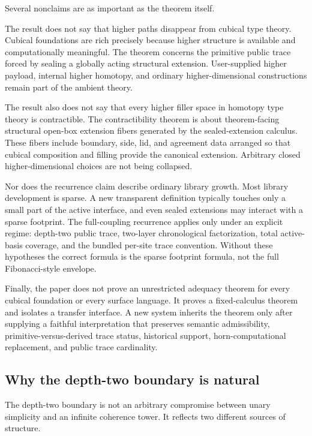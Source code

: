 \documentclass{lmcs}
\begin{document}
Several nonclaims are as important as the theorem itself.

The result does not say that higher paths disappear from cubical type theory.  Cubical
foundations are rich precisely because higher structure is available and computationally
meaningful.  The theorem concerns the primitive public trace forced by sealing a globally
acting structural extension.  User-supplied higher payload, internal higher homotopy, and
ordinary higher-dimensional constructions remain part of the ambient theory.

The result also does not say that every higher filler space in homotopy type theory is
contractible.  The contractibility theorem is about theorem-facing structural open-box
extension fibers generated by the sealed-extension calculus.  These fibers include boundary,
side, lid, and agreement data arranged so that cubical composition and filling provide the
canonical extension.  Arbitrary closed higher-dimensional choices are not being collapsed.

Nor does the recurrence claim describe ordinary library growth.  Most library development is
sparse.  A new transparent definition typically touches only a small part of the active
interface, and even sealed extensions may interact with a sparse footprint.  The full-coupling
recurrence applies only under an explicit regime: depth-two public trace, two-layer
chronological factorization, total active-basis coverage, and the bundled per-site trace
convention.  Without these hypotheses the correct formula is the sparse footprint formula,
not the full Fibonacci-style envelope.

Finally, the paper does not prove an unrestricted adequacy theorem for every cubical
foundation or every surface language.  It proves a fixed-calculus theorem and isolates a
transfer interface.  A new system inherits the theorem only after supplying a faithful
interpretation that preserves semantic admissibility, primitive-versus-derived trace status,
historical support, horn-computational replacement, and public trace cardinality.

\subsection{Why the depth-two boundary is natural}
\label{subsec:conclusion-why-depth-two}

The depth-two boundary is not an arbitrary compromise between unary simplicity and an
infinite coherence tower.  It reflects two different sources of structure.
\end{document}
